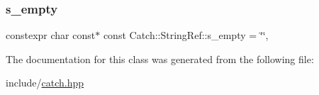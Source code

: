 \subsubsection{\texorpdfstring{s\_empty}{s\_empty}}
{\footnotesize\ttfamily constexpr char const$\ast$ const Catch\+::\+String\+Ref\+::s\+\_\+empty = \char`\"{}\char`\"{}\hspace{0.3cm}{\ttfamily [static]}, {\ttfamily [private]}}



The documentation for this class was generated from the following file\+:\begin{DoxyCompactItemize}
\item 
include/\mbox{\hyperlink{catch_8hpp}{catch.\+hpp}}\end{DoxyCompactItemize}
